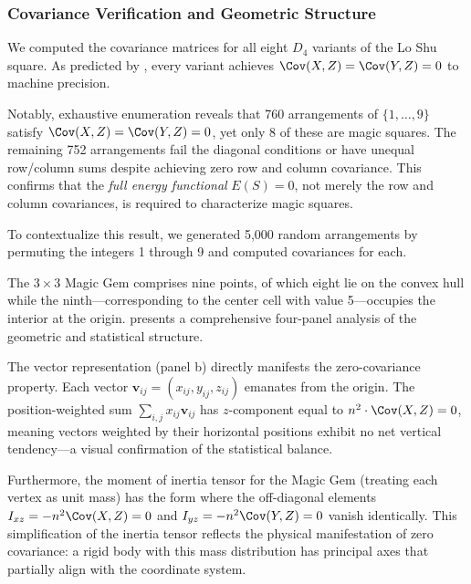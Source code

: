 \subsubsection{Covariance Verification and Geometric Structure}

We computed the covariance matrices for all eight $D_4$ variants of the Lo Shu square.
As predicted by , every variant achieves
$\Cov(X, Z) = \Cov(Y, Z) = 0$ to machine precision.

Notably, exhaustive enumeration reveals that 760 arrangements of $\{1, \ldots, 9\}$ 
satisfy $\Cov(X, Z) = \Cov(Y, Z) = 0$, yet only 8 of these are magic squares.
The remaining 752 arrangements fail the diagonal conditions or have unequal row/column sums
despite achieving zero row and column covariance.
This confirms that the \emph{full energy functional} $E(S) = 0$, 
not merely the row and column covariances, is required to characterize magic squares.

To contextualize this result, we generated 5,000 random arrangements 
by permuting the integers 1 through 9 and computed covariances for each.

The $3 \times 3$ Magic Gem comprises nine points, of which eight lie on the convex hull
while the ninth---corresponding to the center cell with value 5---occupies the interior at the origin.
 presents a comprehensive four-panel analysis of the geometric 
and statistical structure.

The vector representation (panel b) directly manifests the zero-covariance property.
Each vector $\mathbf{v}_{ij} = (x_{ij}, y_{ij}, z_{ij})$ emanates from the origin.
The position-weighted sum $\sum_{i,j} x_{ij} \mathbf{v}_{ij}$ has $z$-component equal to 
$n^2 \cdot \Cov(X,Z) = 0$, meaning vectors weighted by their horizontal positions 
exhibit no net vertical tendency---a visual confirmation of the statistical balance.

Furthermore, the moment of inertia tensor for the Magic Gem (treating each vertex as unit mass) 
has the form where the off-diagonal elements $I_{xz} = -n^2 \Cov(X,Z) = 0$ and $I_{yz} = -n^2 \Cov(Y,Z) = 0$
vanish identically. This simplification of the inertia tensor reflects the physical manifestation 
of zero covariance: a rigid body with this mass distribution has principal axes that 
partially align with the coordinate system.

